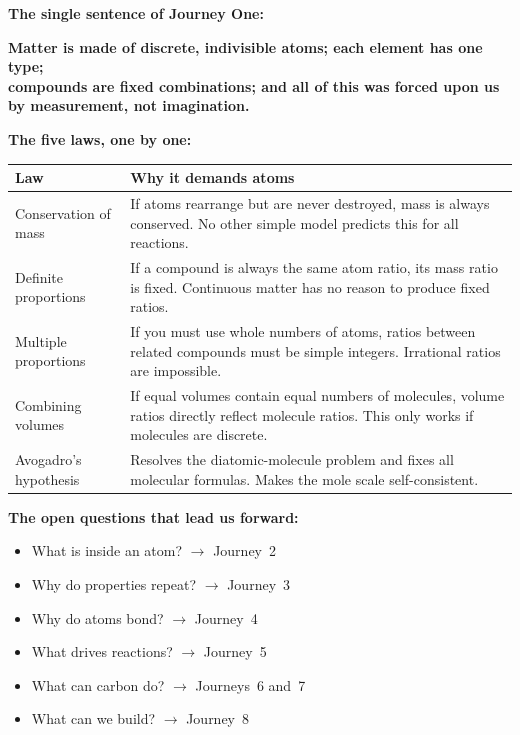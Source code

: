 \documentclass[12pt, a4paper]{book}
\theoremstyle{definition}
\begin{document}
\begin{synthbox}
\textbf{The single sentence of Journey One:}
\begin{center}
\large\sffamily\bfseries
Matter is made of discrete, indivisible atoms;
each element has one type;\\
compounds are fixed combinations;
and all of this was forced upon us\\
by measurement, not imagination.
\end{center}

\vspace{0.6em}
\textbf{The five laws, one by one:}

\vspace{0.3em}
\begin{tabular}{lp{9cm}}
\toprule
\textbf{Law} & \textbf{Why it demands atoms} \\
\midrule
Conservation of mass &
  If atoms rearrange but are never destroyed, mass is always conserved.
  No other simple model predicts this for all reactions. \\[5pt]
Definite proportions &
  If a compound is always the same atom ratio, its mass ratio is fixed.
  Continuous matter has no reason to produce fixed ratios. \\[5pt]
Multiple proportions &
  If you must use whole numbers of atoms, ratios between
  related compounds must be simple integers.
  Irrational ratios are impossible. \\[5pt]
Combining volumes &
  If equal volumes contain equal numbers of molecules,
  volume ratios directly reflect molecule ratios.
  This only works if molecules are discrete. \\[5pt]
Avogadro's hypothesis &
  Resolves the diatomic-molecule problem and fixes all
  molecular formulas. Makes the mole scale self-consistent. \\
\bottomrule
\end{tabular}

\vspace{0.6em}
\textbf{The open questions that lead us forward:}
\begin{itemize}[nosep, leftmargin=2em]
  \item What is inside an atom? $\longrightarrow$ Journey~2
  \item Why do properties repeat? $\longrightarrow$ Journey~3
  \item Why do atoms bond? $\longrightarrow$ Journey~4
  \item What drives reactions? $\longrightarrow$ Journey~5
  \item What can carbon do? $\longrightarrow$ Journeys~6 and~7
  \item What can we build? $\longrightarrow$ Journey~8
\end{itemize}
\end{synthbox}
\end{document}
